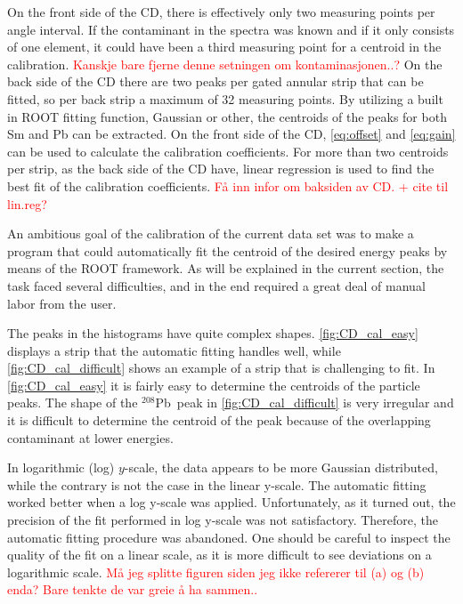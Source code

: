 \documentclass[twoside,english]{uiofysmaster/uiofysmaster}
\newcommand{\Pb}{$^{208}$Pb}
\let\orgautoref\autoref
\renewcommand{\autoref}
        {%
		 \def\sectionautorefname{Section}%
		 \def\subsectionautorefname{Section}%
		 \def\subsubsectionautorefname{Section}%
		 \def\chapterautorefname{Chapter}%
          \orgautoref}
\begin{document}
On the front side of the CD, there is effectively only two measuring points per angle interval. 
If the contaminant in the spectra was known and if it only consists of one element, it could have been a third measuring point for a centroid in the calibration. \textcolor{red}{Kanskje bare fjerne denne setningen om kontaminasjonen..?}
On the back side of the CD there are two peaks per gated annular strip that can be fitted, so per back strip a maximum of 32 measuring points. 
By utilizing a built in ROOT fitting function, Gaussian or other, the centroids of the peaks for both Sm and Pb can be extracted. 
On the front side of the CD, \autoref{eq:offset} and \autoref{eq:gain} can be used to calculate the calibration coefficients.
For more than two centroids per strip, as the back side of the CD have, linear regression is used to find the best fit of the calibration coefficients. \textcolor{red}{Få inn infor om baksiden av CD. + cite til lin.reg?}

An ambitious goal of the calibration of the current data set was to make a program that could automatically fit the centroid of the desired energy peaks by means of the ROOT framework. 
As will be explained in the current section, the task faced several difficulties, and in the end required a great deal of manual labor from the user.

The peaks in the histograms have quite complex shapes.
\autoref{fig:CD_cal_easy} displays a strip that the automatic fitting handles well, while \autoref{fig:CD_cal_difficult} shows an example of a strip that is challenging to fit.
In \autoref{fig:CD_cal_easy} it is fairly easy to determine the centroids of the particle peaks.
The shape of the \Pb\ peak in \autoref{fig:CD_cal_difficult} is very irregular and it is difficult to determine the centroid of the peak because of the overlapping contaminant at lower energies.

In logarithmic (log) $y$-scale, the data appears to be more Gaussian distributed, while the contrary is not the case in the linear y-scale. 
The automatic fitting worked better when a log y-scale was applied.
Unfortunately, as it turned out, the precision of the fit performed in log y-scale was not satisfactory.
Therefore, the automatic fitting procedure was abandoned.
One should be careful to inspect the quality of the fit on a linear scale, as it is more difficult to see deviations on a logarithmic scale. 
\textcolor{red}{Må jeg splitte figuren siden jeg ikke refererer til (a) og (b) enda? Bare tenkte de var greie å ha sammen..}
\end{document}
